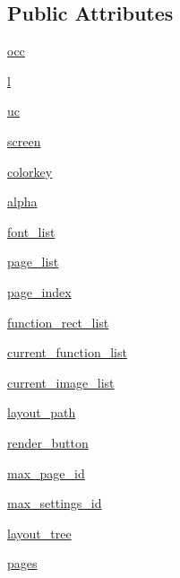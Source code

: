 \subsection*{Public Attributes}
\begin{DoxyCompactItemize}
\item 
\hyperlink{classlayout_1_1layout_ac2fa1280be7977398ef3930c71568bdc}{occ}
\item 
\hyperlink{classlayout_1_1layout_a4e986be62085ff0ab88f24f4f053a955}{l}
\item 
\hyperlink{classlayout_1_1layout_a6e471177d664a814812f91fddef0b7d5}{uc}
\item 
\hyperlink{classlayout_1_1layout_aa588f7b44d84ec47ee98b72d8931b32c}{screen}
\item 
\hyperlink{classlayout_1_1layout_af1446e9aff89ce7dc077ffbfb712a052}{colorkey}
\item 
\hyperlink{classlayout_1_1layout_aee06a90eb791724cd6e202d6f88d31c6}{alpha}
\item 
\hyperlink{classlayout_1_1layout_a06edc6452a97f2a9d01458b4be14a667}{font\+\_\+list}
\item 
\hyperlink{classlayout_1_1layout_ac2a7dddbdc8f01532f9a0909020b2232}{page\+\_\+list}
\item 
\hyperlink{classlayout_1_1layout_a7c8c93302999f031ee770dcb10573bce}{page\+\_\+index}
\item 
\hyperlink{classlayout_1_1layout_af63f4624614b7ae46c605cd3b9d423b0}{function\+\_\+rect\+\_\+list}
\item 
\hyperlink{classlayout_1_1layout_ad5d1acad80f3953301aa65f70f60a58c}{current\+\_\+function\+\_\+list}
\item 
\hyperlink{classlayout_1_1layout_af54aa665178f598e88cb6016e8a5e708}{current\+\_\+image\+\_\+list}
\item 
\hyperlink{classlayout_1_1layout_ac7b9c2e760d1fd038ee8713760a5da73}{layout\+\_\+path}
\item 
\hyperlink{classlayout_1_1layout_a97a69f80a2dbb74741ea77e29ee120bf}{render\+\_\+button}
\item 
\hyperlink{classlayout_1_1layout_a88de9975a466f3626ca730c6e2d6f44e}{max\+\_\+page\+\_\+id}
\item 
\hyperlink{classlayout_1_1layout_a875fbf0d63aa271f27de8ae4cb877326}{max\+\_\+settings\+\_\+id}
\item 
\hyperlink{classlayout_1_1layout_ae5432ae42bbf064247b2786253de56eb}{layout\+\_\+tree}
\item 
\hyperlink{classlayout_1_1layout_a7e12699e54d9a8aeb1e0a7716c3f13ea}{pages}

\end{DoxyCompactItemize}
